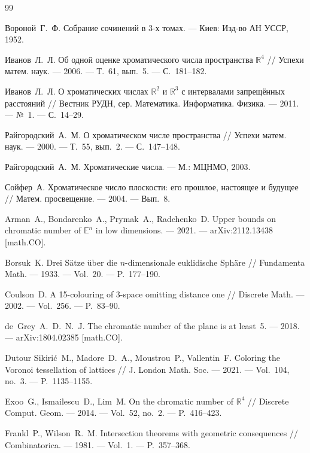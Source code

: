 \documentclass[12pt]{article}
\theoremstyle{plain}
\theoremstyle{definition}
\theoremstyle{remark}
\newcommand{\RR}{\mathbb{R}}
\begin{document}
\begin{thebibliography}{99}

Вороной~Г.~Ф. Собрание сочинений в 3-х томах. --- Киев: Изд-во АН УССР, 1952.

Иванов~Л.~Л. Об одной оценке хроматического числа пространства $\RR^4$ //
Успехи матем. наук. --- 2006. --- Т.~61, вып.~5. --- С.~181--182.

Иванов~Л.~Л. О хроматических числах $\RR^2$ и $\RR^3$ с интервалами
запрещённых расстояний // Вестник РУДН, сер. Математика. Информатика.
Физика. --- 2011. --- №~1. --- С.~14--29.

Райгородский~А.~М. О хроматическом числе пространства // Успехи матем.
наук. --- 2000. --- Т.~55, вып.~2. --- С.~147--148.

Райгородский~А.~М. Хроматические числа. --- М.: МЦНМО, 2003.

Сойфер~А. Хроматическое число плоскости: его прошлое, настоящее и будущее //
Матем. просвещение. --- 2004. --- Вып.~8.

Arman~A., Bondarenko~A., Prymak~A., Radchenko~D. Upper bounds on chromatic
number of $\mathbb{E}^n$ in low dimensions. --- 2021. ---
arXiv:2112.13438 [math.CO].

Borsuk~K. Drei S\"atze \"uber die $n$-dimensionale euklidische Sph\"are //
Fundamenta Math. --- 1933. --- Vol.~20. --- P.~177--190.

Coulson~D. A 15-colouring of 3-space omitting distance one // Discrete
Math. --- 2002. --- Vol.~256. --- P.~83--90.

de~Grey~A.~D.~N.~J. The chromatic number of the plane is at least~5. ---
2018. --- arXiv:1804.02385 [math.CO].

Dutour Sikiri\'c~M., Madore~D.~A., Moustrou~P., Vallentin~F. Coloring the
Voronoi tessellation of lattices // J. London Math. Soc. --- 2021. ---
Vol.~104, no.~3. --- P.~1135--1155.

Exoo~G., Ismailescu~D., Lim~M. On the chromatic number of $\RR^4$ //
Discrete Comput. Geom. --- 2014. --- Vol.~52, no.~2. --- P.~416--423.

Frankl~P., Wilson~R.~M. Intersection theorems with geometric consequences //
Combinatorica. --- 1981. --- Vol.~1. --- P.~357--368.


\end{thebibliography}
\end{document}
